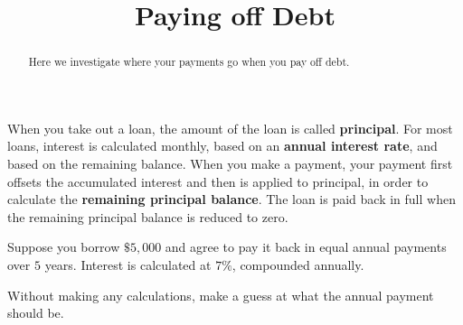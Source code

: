 \documentclass[,nooutcomes]{ximera}
\title{Paying off Debt}
\begin{document}
\begin{abstract}
Here we investigate where your payments go when you pay off debt.
\end{abstract}
\maketitle

When you take out a loan, the amount of the loan is called
\textbf{principal}.  For most loans, interest is calculated monthly,
based on an \textbf{annual interest rate}, and based on the remaining
balance.  When you make a payment, your payment first offsets the
accumulated interest and then is applied to principal, in order to
calculate the \textbf{remaining principal balance}.  The loan is paid
back in full when the remaining principal balance is reduced to zero.
\begin{question}
Suppose you borrow $\$5,000$ and agree to pay it back in equal annual
payments over $5$ years.  Interest is calculated at $7\%$,
compounded annually. 

Without making any calculations, make a guess at what the annual payment should be.  
\begin{freeResponse}
\end{freeResponse}
\end{question}
\end{document}
